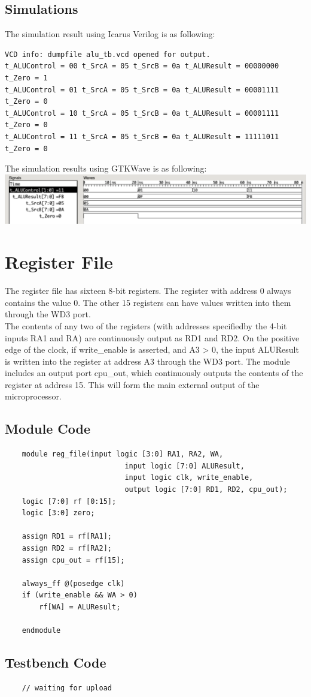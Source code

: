 \documentclass{article}
\begin{document}
\subsection{Simulations}
The simulation result using Icarus Verilog is as following:
\begin{Verbatim}
VCD info: dumpfile alu_tb.vcd opened for output.
t_ALUControl = 00 t_SrcA = 05 t_SrcB = 0a t_ALUResult = 00000000 t_Zero = 1
t_ALUControl = 01 t_SrcA = 05 t_SrcB = 0a t_ALUResult = 00001111 t_Zero = 0
t_ALUControl = 10 t_SrcA = 05 t_SrcB = 0a t_ALUResult = 00001111 t_Zero = 0
t_ALUControl = 11 t_SrcA = 05 t_SrcB = 0a t_ALUResult = 11111011 t_Zero = 0
\end{Verbatim}
The simulation results using GTKWave is as following:\vspace{5pt}\\
\includegraphics[width=\textwidth]{alu.png}

\newpage
\section{Register File}
The register file has sixteen 8-bit registers. The register with address 0 always contains the value 0. The other 15 registers can have values written into them through the WD3 port.\\
The contents of any two of the registers (with addresses specifiedby the 4-bit inputs RA1 and RA) are continuously output as RD1 and RD2. On the positive edge of the clock, if write\_enable is asserted, and A3 > 0, the input ALUResult is written into the register at address A3 through the WD3 port. The module includes an output port cpu\_out, which continuously outputs the contents of the register at address 15. This will form the main external output of the microprocessor.
\subsection{Module Code}
\begin{lstlisting}
    module reg_file(input logic [3:0] RA1, RA2, WA, 
                            input logic [7:0] ALUResult,
                            input logic clk, write_enable,
                            output logic [7:0] RD1, RD2, cpu_out); 
    logic [7:0] rf [0:15];
    logic [3:0] zero;

    assign RD1 = rf[RA1]; 
    assign RD2 = rf[RA2]; 
    assign cpu_out = rf[15];

    always_ff @(posedge clk) 
    if (write_enable && WA > 0) 
        rf[WA] = ALUResult;

    endmodule
\end{lstlisting}
\subsection{Testbench Code}
\begin{lstlisting}
    // waiting for upload
\end{lstlisting}
\end{document}

